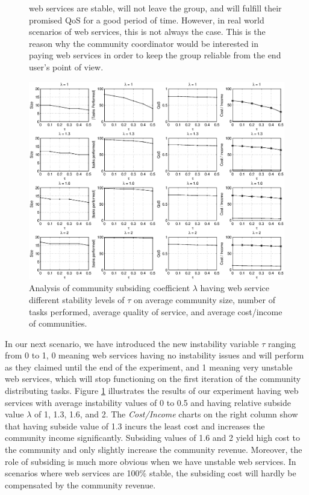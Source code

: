 \begin{figure}%
web services are stable, will not leave the group, and will
fulfill their promised QoS for a good period of time. However, in
real world scenarios of web services, this is not always the case.
This is the reason why the community coordinator would be interested in paying
web services in order to keep the group reliable from the end
user's point of view.
\centerline{\includegraphics[width=6.8in]{tax_dyn.eps}}
\caption{Analysis of community subsiding coefficient $\lambda$
having web service different stability levels of $\tau$ on average
community size, number of tasks performed, average quality of
service, and average cost/income of communities.}
\label{fig_dynamic_taxtation}
\end{figure}


In our next scenario, we have introduced the
new instability variable $\tau$ ranging from 0 to 1, 0 meaning web
services having no instability issues and will perform as they
claimed until the end of the experiment, and 1 meaning very
unstable web services, which will stop functioning on the first
iteration of the community distributing tasks. Figure
\ref{fig_dynamic_taxtation} illustrates the results of our
experiment having web services with average instability values of
0 to 0.5 and having relative subside value $\lambda$ of 1, 1.3,
1.6, and 2. The \emph{Cost/Income} charts on the right column show
that having subside value of 1.3 incurs the least cost and
increases the community income significantly. Subsiding values of
1.6 and 2 yield high cost to the community and only slightly
increase the community revenue. Moreover, the role of subsiding is
much more obvious when we have unstable web services. In scenarios
where web services are 100\% stable, the subsiding cost will
hardly be compensated by the community revenue.

